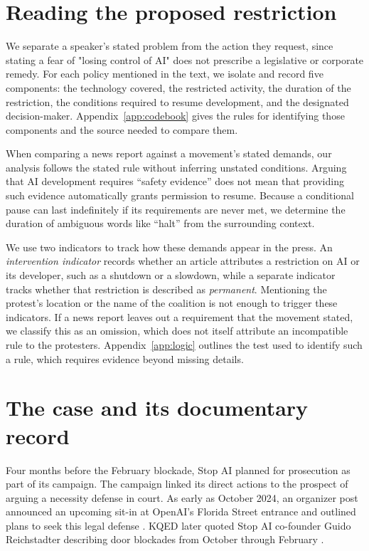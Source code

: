 \documentclass[11pt]{article}
\begin{document}
\section{Reading the proposed restriction}
We separate a speaker's stated problem from the action they request, since stating a fear of "losing control of AI" does not prescribe a legislative or corporate remedy. For each policy mentioned in the text, we isolate and record five components: the technology covered, the restricted activity, the duration of the restriction, the conditions required to resume development, and the designated decision-maker. Appendix~\ref{app:codebook} gives the rules for identifying those components and the source needed to compare them.

When comparing a news report against a movement's stated demands, our analysis follows the stated rule without inferring unstated conditions. Arguing that AI development requires ``safety evidence'' does not mean that providing such evidence automatically grants permission to resume. Because a conditional pause can last indefinitely if its requirements are never met, we determine the duration of ambiguous words like ``halt'' from the surrounding context.

We use two indicators to track how these demands appear in the press. An \textit{intervention indicator} records whether an article attributes a restriction on AI or its developer, such as a shutdown or a slowdown, while a separate indicator tracks whether that restriction is described as \textit{permanent}. Mentioning the protest's location or the name of the coalition is not enough to trigger these indicators. If a news report leaves out a requirement that the movement stated, we classify this as an omission, which does not itself attribute an incompatible rule to the protesters. Appendix~\ref{app:logic} outlines the test used to identify such a rule, which requires evidence beyond missing details.

\section{The case and its documentary record}
Four months before the February blockade, Stop AI planned for prosecution as part of its campaign. The campaign linked its direct actions to the prospect of arguing a necessity defense in court. As early as October 2024, an organizer post announced an upcoming sit-in at OpenAI's Florida Street entrance and outlined plans to seek this legal defense \citep{october}. KQED later quoted Stop AI co-founder Guido Reichstadter describing door blockades from October through February \citep{krans,stoprelease}.
\end{document}
